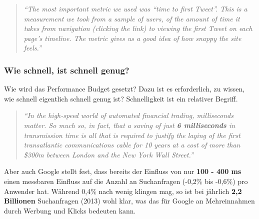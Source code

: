 				\begin{quote}
					\textit{"`The most important metric we used was “time to first Tweet”. This is a measurement we took from a sample of users, of the amount of time it takes from navigation (clicking the link) to viewing the first Tweet on each page’s timeline. The metric gives us a good idea of how snappy the site feels."'} \autocite{twitter12}
				\end{quote}


			\subsubsection{Wie schnell, ist schnell genug?} %
			\label{ssub:wie_schnell_ist_schnell_genug_}
				Wie wird das Performance Budget gesetzt? Dazu ist es erforderlich, zu wissen, wie schnell eigentlich schnell genug ist? Schnelligkeit ist ein relativer Begriff.

				\begin{quote}
					\textit{"`In the high-speed world of automated financial trading, milliseconds matter. So much so, in fact, that a saving of just \textbf{6 milliseconds} in transmission time is all that is required to justify the laying of the first transatlantic communications cable for 10 years at a cost of more than \$300m between London and the New York Wall Street."'} \autocite[vgl.]{telegraph11}
				\end{quote}

				Aber auch Google stellt fest, dass bereits der Einfluss von nur \textbf{100 - 400 ms} einen messbaren Einfluss auf die Anzahl an Suchanfragen (-0,2\% bis -0,6\%) pro Anwender hat.\autocite{google09} Während 0,4\% nach wenig klingen mag, so ist bei jährlich \textbf{2,2 Billionen} Suchanfragen (2013) wohl klar, was das für Google an Mehreinnahmen durch Werbung und Klicks bedeuten kann.\autocite{statista14}\\
					
